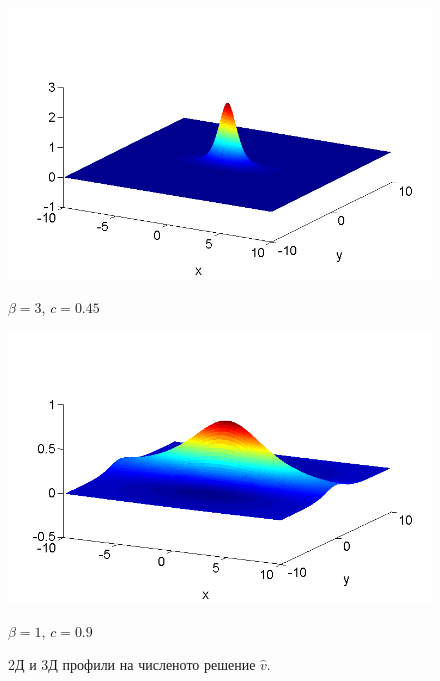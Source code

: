 \documentclass{beamer}
\begin{document}
\begin{frame}
\begin{figure}[ht]
	\begin{minipage}[b]{0.45\linewidth}
		 \raggedleft
		\includegraphics[width=\linewidth]{../Thesis/SolutionView/ChristovIC_30_bt3_c045_prpview.png}		
		\centerline{$\beta = 3$, $c = 0.45$ }
	\end{minipage}
	\begin{minipage}[b]{0.45\linewidth}
		 \raggedright
		\includegraphics[width=\linewidth]{../Thesis/SolutionView/ChristovIC_128_bt1_c090_prpview.png}
		\centerline{$\beta = 1$, $c = 0.9$}
	\end{minipage}
	\caption{2Д и 3Д профили на численото решение $\widehat v$.}
	\label{fig:solutions}
\end{figure}

\end{frame}
\end{document}
